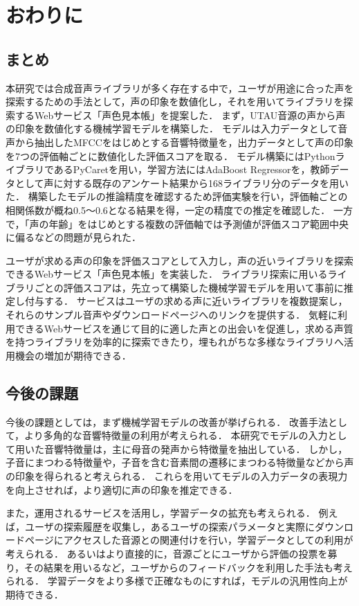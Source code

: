 \chapter{おわりに}
\thispagestyle{myheadings}

\section{まとめ}
本研究では合成音声ライブラリが多く存在する中で，ユーザが用途に合った声を探索するための手法として，声の印象を数値化し，それを用いてライブラリを探索するWebサービス「声色見本帳」を提案した．
まず，UTAU音源の声から声の印象を数値化する機械学習モデルを構築した．
モデルは入力データとして音声から抽出したMFCCをはじめとする音響特徴量を，出力データとして声の印象を7つの評価軸ごとに数値化した評価スコアを取る．
モデル構築にはPythonライブラリであるPyCaretを用い，学習方法にはAdaBoost Regressorを，教師データとして声に対する既存のアンケート結果から168ライブラリ分のデータを用いた．
構築したモデルの推論精度を確認するため評価実験を行い，評価軸ごとの相関係数が概ね0.5〜0.6となる結果を得，一定の精度での推定を確認した．
一方で，「声の年齢」をはじめとする複数の評価軸では予測値が評価スコア範囲中央に偏るなどの問題が見られた．

ユーザが求める声の印象を評価スコアとして入力し，声の近いライブラリを探索できるWebサービス「声色見本帳」を実装した．
ライブラリ探索に用いるライブラリごとの評価スコアは，先立って構築した機械学習モデルを用いて事前に推定し付与する．
サービスはユーザの求める声に近いライブラリを複数提案し，それらのサンプル音声やダウンロードページへのリンクを提供する．
気軽に利用できるWebサービスを通じて目的に適した声との出会いを促進し，求める声質を持つライブラリを効率的に探索できたり，埋もれがちな多様なライブラリへ活用機会の増加が期待できる．

\section{今後の課題}
今後の課題としては，まず機械学習モデルの改善が挙げられる．
改善手法として，より多角的な音響特徴量の利用が考えられる．
本研究でモデルの入力として用いた音響特徴量は，主に母音の発声から特徴量を抽出している．
しかし，子音にまつわる特徴量や，子音を含む音素間の遷移にまつわる特徴量などから声の印象を得られると考えられる．
これらを用いてモデルの入力データの表現力を向上させれば，より適切に声の印象を推定できる．

また，運用されるサービスを活用し，学習データの拡充も考えられる．
例えば，ユーザの探索履歴を収集し，あるユーザの探索パラメータと実際にダウンロードページにアクセスした音源との関連付けを行い，学習データとしての利用が考えられる．
あるいはより直接的に，音源ごとにユーザから評価の投票を募り，その結果を用いるなど，ユーザからのフィードバックを利用した手法も考えられる．
学習データをより多様で正確なものにすれば，モデルの汎用性向上が期待できる．

